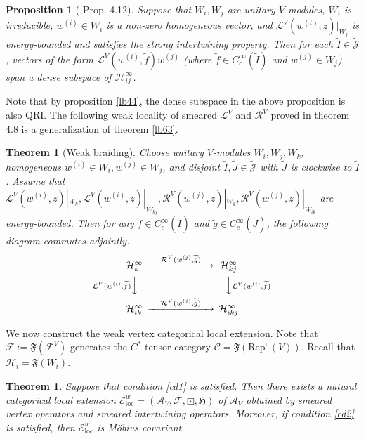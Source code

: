 \documentclass[12pt,a4paper]{article}
\theoremstyle{definition}
\theoremstyle{plain}
\newtheorem{thm}[df]{Theorem}
\newtheorem{pp}[df]{Proposition}
\newcommand{\fk}{\mathfrak}
\newcommand{\mc}{\mathcal}
\newcommand{\wtd}{\widetilde}
\newcommand{\loc}{\mathrm{loc}}
\newcommand{\scr}{\mathscr}
\newcommand{\Jtd}{\widetilde{\mathcal J}}
\newcommand{\RepuV}{\mathrm{Rep}^{\mathrm u}(V)}
\numberwithin{equation}{subsection}
\begin{document}
\begin{pp}[\cite{Gui21a} Prop. 4.12]\label{lb58}
Suppose that $W_i,W_j$ are unitary $V$-modules, $W_i$ is irreducible, $w^{(i)}\in W_i$ is a non-zero homogeneous vector, and $\mc L^V(w^{(i)},z)|_{W_j}$ is energy-bounded and satisfies the strong intertwining property.  Then for each  $\wtd I\in\Jtd$, vectors of the form $\mc L^V(w^{(i)},\wtd f)w^{(j)}$ (where $\wtd f\in C_c^\infty(\wtd I)$ and $w^{(j)}\in W_j$) span a dense subspace of $\mc H_{ij}^\infty$.
\end{pp}


Note that by proposition \ref{lb44}, the dense subspace in the above proposition is also QRI. The following weak locality of smeared $\mc L^V$ and $\mc R^V$  proved in \cite{Gui21a} theorem 4.8 is a generalization of theorem \ref{lb63}.

\begin{thm}[Weak braiding]\label{lb60}
Choose unitary $V$-modules $W_i,W_j,W_k$, homogeneous $w^{(i)}\in W_i,w^{(j)}\in W_j$, and disjoint $\wtd I,\wtd J\in \Jtd$ with $\wtd J$ is clockwise to $\wtd I$. Assume that  $\mc L^V(w^{(i)},z)|_{W_k},\mc L^V(w^{(i)},z)|_{W_{kj}},\mc R^V(w^{(j)},z)|_{W_k},\mc R^V(w^{(j)},z)|_{W_{ik}}$ are energy-bounded. Then for any $\wtd f\in C_c^\infty(\wtd I)$ and $\wtd g\in C_c^\infty(\wtd J)$, the following diagram commutes adjointly.
	\begin{align}\label{eq42}
	\begin{CD}
	\mc H^\infty_k @> \quad\mc R^V(w^{(j)},\wtd g)\quad >> \mc H^\infty_{kj}\\
	@V {\mc L^V(w^{(i)},\wtd f)} VV @VV {\mc L^V(w^{(i)},\wtd f)} V\\
	\mc H^\infty_{ik} @> \quad\mc R^V(w^{(j)},\wtd g)\quad>> \mc H^\infty_{ikj}
	\end{CD}
	\end{align}
\end{thm}



We now construct the weak vertex categorical local extension. Note that $\mc F:=\fk F(\mc F^V)$ generates the $C^*$-tensor category $\scr C=\fk F(\RepuV)$. Recall that $\mc H_i=\fk F(W_i)$.

\begin{thm}
Suppose that condition \ref{cd1} is satisfied. Then there exists a natural categorical local extension $\scr E^w_\loc=(\mc A_V,\mc F,\boxdot,\fk H)$ of $\mc A_V$ obtained by smeared vertex operators and smeared intertwining operators. Moreover, if condition \ref{cd2} is satisfied, then $\scr E^w_\loc$ is M\"obius covariant.
\end{thm}
\end{document}
